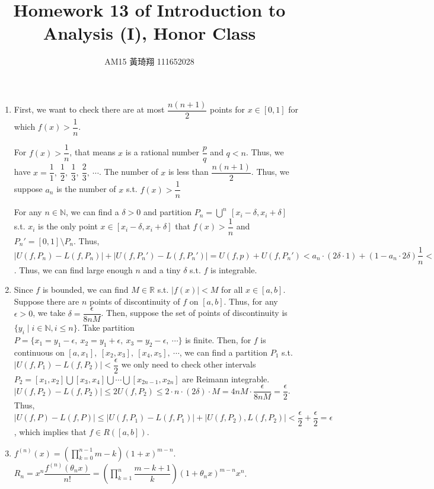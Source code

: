 \documentclass[12pt]{article}
\title{Homework 13 of Introduction to Analysis (I), Honor Class}
\author{AM15 黃琦翔 111652028}
\begin{document}
\maketitle
\begin{enumerate}
    \item First, we want to check there are at most $\dfrac{n(n+1)}{2}$ points for $x\in [0, 1]$ for which $f(x) > \dfrac{1}{n}$.
    
    For $f(x) > \dfrac{1}{n}$, that means $x$ is a rational number $\dfrac{p}{q}$ and $q < n$.
    Thus, we have $x = \dfrac{1}{1},\ \dfrac{1}{2},\ \dfrac{1}{3},\ \dfrac{2}{3},\ \cdots$.
    The number of $x$ is less than $\dfrac{n(n+1)}{2}$. Thus, we suppose $a_n$ is the number of $x$ s.t.  $f(x) > \dfrac{1}{n}$

    For any $n\in \mathbb{N}$, we can find a $\delta > 0$ and  partition $P_n = \displaystyle\bigcup^n\ [x_i - \delta, x_i + \delta]$ s.t. $x_i$ is the only point $x\in [x_i-\delta, x_i + \delta]$ that $f(x) > \dfrac{1}{n}$  and $P_n' = [0, 1]\setminus P_n$.
    Thus, $|U(f, P_n) - L(f, P_n)| + |U(f, P_n') - L(f, P_n')| = U(f, p) + U(f, P_n') < a_n\cdot(2\delta\cdot 1) + (1-a_n\cdot 2\delta)\dfrac{1}{n} < \dfrac{1}{n} + a_n \cdot 2\delta$.
    Thus, we can find large enough $n$ and a tiny $\delta$ s.t. $f$ is integrable.

    \item Since $f$ is bounded, we can find $M\in \mathbb{R}$ s.t. $|f(x)| < M$ for all $x\in [a, b]$.
    Suppose there are $n$ points of discontinuity of $f$ on $[a, b]$.
    Thus, for any $\epsilon > 0$, we take $\delta = \dfrac{\epsilon}{8nM}$.
    Then, suppose the set of points of discontinuity is $\lbrace y_i\mid i \in \mathbb{N}, i \leq n\rbrace$.
    Take partition $P = \lbrace x_1 = y_1 - \epsilon,\ x_2 = y_1 + \epsilon,\ x_3 = y_2-\epsilon,\ \cdots\rbrace$ is finite.
    Then, for $f$ is continuous on $[a, x_1],\ [x_2, x_3],\ [x_4, x_5],\ \cdots$, 
    we can find a partition $P_1$ s.t. $|U(f, P_1) - L(f, P_2)| < \dfrac{\epsilon}{2}$
    we only need to check other intervals $P_2 = [x_1, x_2]\bigcup [x_3, x_4]\bigcup \cdots \bigcup [x_{2n-1}, x_{2n}]$ are Reimann integrable.
    $|U(f, P_2) - L(f, P_2)| \leq 2U(f, P_2) \leq 2\cdot n \cdot  (2\delta) \cdot M = 4nM \cdot \dfrac{\epsilon}{8nM} = \dfrac{\epsilon}{2}$.
    Thus, $|U(f, P) - L(f, P)| \leq |U(f, P_1) - L(f, P_1)| + |U(f, P_2), L(f, P_2)| < \dfrac{\epsilon}{2} + \dfrac{\epsilon}{2} = \epsilon$, which implies that $f\in R([a, b])$.

    \newpage
    \item $f^{(n)}(x) = (\displaystyle\prod_{k=0}^{n-1} m-k) (1 + x)^{m-n}$.
    $R_n = x^n \dfrac{f^{(n)}(\theta_n x)}{n!} = (\displaystyle\prod_{k=1}^{n}\dfrac{m-k+1}{k}) (1+\theta_n x)^{m-n}x^n$.


\end{enumerate}
\end{document}

